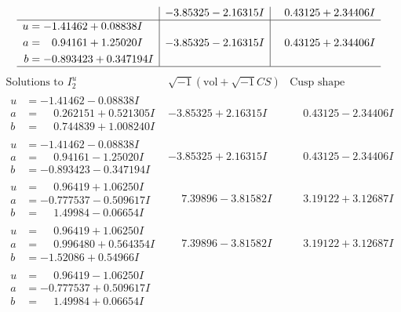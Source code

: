 \documentclass[1p]{elsarticle_modified}
\theoremstyle{definition}
\newcommand{\I}{\sqrt{-1}}
\begin{document}
$$\begin{array}{c|c|c}
 & -3.85325 - 2.16315 I & \phantom{-}0.43125 + 2.34406 I \\ \hline\begin{aligned}
u &= -1.41462 + 0.08838 I \\
a &= \phantom{-}0.94161 + 1.25020 I \\
b &= -0.893423 + 0.347194 I\end{aligned}
 & -3.85325 - 2.16315 I & \phantom{-}0.43125 + 2.34406 I\\
 \hline 
 \end{array}$$\newpage$$\begin{array}{c|c|c}  
\text{Solutions to }I^u_{2}& \I (\text{vol} + \sqrt{-1}CS) & \text{Cusp shape}\\
 \hline 
\begin{aligned}
u &= -1.41462 - 0.08838 I \\
a &= \phantom{-}0.262151 + 0.521305 I \\
b &= \phantom{-}0.744839 + 1.008240 I\end{aligned}
 & -3.85325 + 2.16315 I & \phantom{-}0.43125 - 2.34406 I \\ \hline\begin{aligned}
u &= -1.41462 - 0.08838 I \\
a &= \phantom{-}0.94161 - 1.25020 I \\
b &= -0.893423 - 0.347194 I\end{aligned}
 & -3.85325 + 2.16315 I & \phantom{-}0.43125 - 2.34406 I \\ \hline\begin{aligned}
u &= \phantom{-}0.96419 + 1.06250 I \\
a &= -0.777537 - 0.509617 I \\
b &= \phantom{-}1.49984 - 0.06654 I\end{aligned}
 & \phantom{-}7.39896 - 3.81582 I & \phantom{-}3.19122 + 3.12687 I \\ \hline\begin{aligned}
u &= \phantom{-}0.96419 + 1.06250 I \\
a &= \phantom{-}0.996480 + 0.564354 I \\
b &= -1.52086 + 0.54966 I\end{aligned}
 & \phantom{-}7.39896 - 3.81582 I & \phantom{-}3.19122 + 3.12687 I \\ \hline\begin{aligned}
u &= \phantom{-}0.96419 - 1.06250 I \\
a &= -0.777537 + 0.509617 I \\
b &= \phantom{-}1.49984 + 0.06654 I\end{aligned}

\end{array}$$
\end{document}
